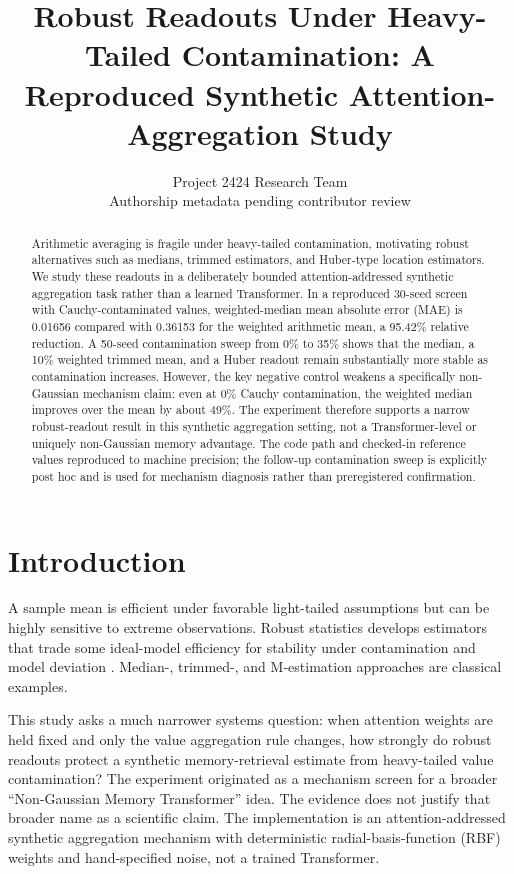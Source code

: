\documentclass[10pt]{article}
\title{Robust Readouts Under Heavy-Tailed Contamination: A Reproduced Synthetic Attention-Aggregation Study}
\author{Project 2424 Research Team\\\small Authorship metadata pending contributor review}
\date{}
\begin{document}
\maketitle

\begin{abstract}
Arithmetic averaging is fragile under heavy-tailed contamination, motivating robust alternatives such as medians, trimmed estimators, and Huber-type location estimators. We study these readouts in a deliberately bounded attention-addressed synthetic aggregation task rather than a learned Transformer. In a reproduced 30-seed screen with Cauchy-contaminated values, weighted-median mean absolute error (MAE) is 0.01656 compared with 0.36153 for the weighted arithmetic mean, a 95.42\% relative reduction. A 50-seed contamination sweep from 0\% to 35\% shows that the median, a 10\% weighted trimmed mean, and a Huber readout remain substantially more stable as contamination increases. However, the key negative control weakens a specifically non-Gaussian mechanism claim: even at 0\% Cauchy contamination, the weighted median improves over the mean by about 49\%. The experiment therefore supports a narrow robust-readout result in this synthetic aggregation setting, not a Transformer-level or uniquely non-Gaussian memory advantage. The code path and checked-in reference values reproduced to machine precision; the follow-up contamination sweep is explicitly post hoc and is used for mechanism diagnosis rather than preregistered confirmation.
\end{abstract}

\section{Introduction}
A sample mean is efficient under favorable light-tailed assumptions but can be highly sensitive to extreme observations. Robust statistics develops estimators that trade some ideal-model efficiency for stability under contamination and model deviation \cite{huber1964,rousseeuw1991,loh2025}. Median-, trimmed-, and M-estimation approaches are classical examples.

This study asks a much narrower systems question: when attention weights are held fixed and only the value aggregation rule changes, how strongly do robust readouts protect a synthetic memory-retrieval estimate from heavy-tailed value contamination? The experiment originated as a mechanism screen for a broader ``Non-Gaussian Memory Transformer'' idea. The evidence does not justify that broader name as a scientific claim. The implementation is an attention-addressed synthetic aggregation mechanism with deterministic radial-basis-function (RBF) weights and hand-specified noise, not a trained Transformer.
\end{document}
